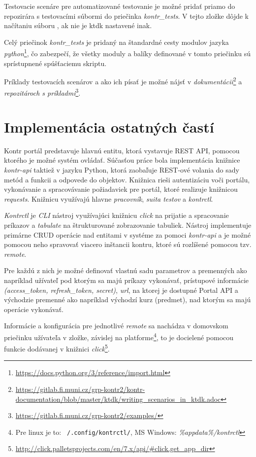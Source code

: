 \documentclass[
  digital, %
  twoside, %
  table,   %
  lof,     %
  lot,     %
]{fithesis3}
\begin{document}
Testovacie scenáre pre automatizované testovanie je možné pridať priamo do repozirára s testovacími súbormi do priečinka \emph{kontr\_tests}. V tejto zložke dôjde k načítaniu súboru , ak nie je ktdk nastavené inak.

Celý priečinok \emph{kontr\_tests} je pridaný na štandardné cesty modulov jazyka \emph{python}\footnote{\url{https://docs.python.org/3/reference/import.html}}, čo zabezpečí, že všetky moduly a balíky definované v tomto priečinku sú sprístupnené spúšťaciemu skriptu.

Príklady testovacích scenárov a ako ich písať je možné nájsť v \emph{dokumentácii}\footnote{\url{https://gitlab.fi.muni.cz/grp-kontr2/kontr-documentation/blob/master/ktdk/writing_scenarios_in_ktdk.adoc}} a \emph{repozitároch s príkladmi}\footnote{\url{https://gitlab.fi.muni.cz/grp-kontr2/examples/}}. 

\section{Implementácia ostatných častí}

Kontr portál predstavuje hlavnú entitu, ktorá vystavuje REST API, pomocou ktorého je možné systém ovládať. Súčasťou práce bola implementácia knižnice \emph{kontr-api} taktiež v jazyku Python, ktorá zaobaľuje REST-ové volania do sady metód a funkcii a odpovede do objektov. Knižnica rieši autentizáciu voči portálu, vykonávanie a spracovávanie požiadaviek pre portál, ktoré realizuje knižnicou \emph{requests}. 
Knižnicu využívajú hlavne \emph{pracovník}, \emph{suita testov} a \emph{kontrctl}. 

\emph{Kontrctl} je \emph{CLI} nástroj využívajúci knižnicu \emph{click} na prijatie a spracovanie príkazov a \emph{tabulate} na štrukturované zobrazovanie tabuliek. Nástroj implementuje primárne CRUD operácie nad entitami v systéme za pomoci \emph{kontr-api} a je možné pomocou neho spravovať viacero inštancii kontru, ktoré sú rozlíšené pomocou tzv. \emph{remote}. 

Pre každú z nich je možné definovať vlastnú sadu parametrov a premenných ako napríklad užívateľ pod ktorým sa majú príkazy vykonávať, prístupové informácie \emph{(access\_token, refresh\_token, secret)}, \emph{url}, na ktorej je dostupné Portal API a východzie premenné ako napríklad východzí kurz (predmet), nad ktorým sa majú operácie vykonávať.

Informácie a konfigurácia pre jednotlivé \emph{remote} sa nachádza v domovskom priečinku užívateľa v zložke, závislej na platforme\footnote{Pre linux je to: \texttt{~/.config/kontrctl/}, MS Windows: \emph{\%appdata\%/kontrctl}}, to je docielené pomocou funkcie dodávanej v knižnici \emph{click}\footnote{\url{http://click.palletsprojects.com/en/7.x/api/#click.get_app_dir}}.
\end{document}
